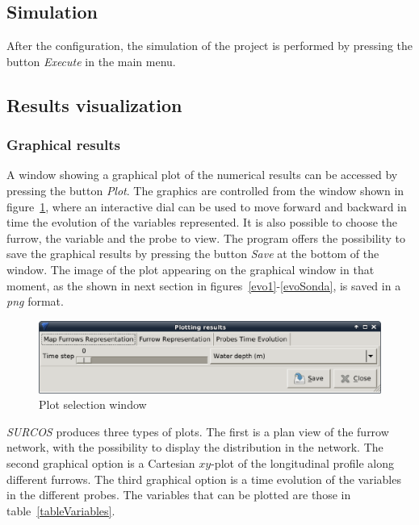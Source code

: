 \documentclass[review,authoryear]{elsarticle}
\begin{document}
\subsection{Simulation}

After the configuration, the simulation of the project is performed by pressing
the button \emph{Execute} in the main menu.

\subsection{Results visualization}

\subsubsection{Graphical results}

A window showing a graphical plot of the numerical results can be accessed by
pressing the button \emph{Plot}.
The graphics are controlled from the window shown in figure~\ref{barraRepres},
where an interactive dial can be used to move forward and backward in time the
evolution of the variables represented. It is also possible to choose the
furrow, the variable and the probe to view.  The program offers the possibility
to save the graphical results by pressing the button \emph{Save} at the bottom
of the window. The image of the plot appearing on the graphical window in that
moment, as the shown in next section in figures~\ref{evo1}-\ref{evoSonda}, is
saved in a \emph{png} format.

\begin{figure}[!ht]
\begin{center}
\includegraphics[width=706\UNIT]{menuRepresEN.eps}
\caption{Plot selection window}\label{barraRepres}
\end{center}
\end{figure}

\emph{SURCOS} produces three types of plots. The first is a plan view of
the furrow network, with the possibility to display the distribution in the
network. The second graphical option is a Cartesian $xy$-plot of the
longitudinal profile along different furrows. The third graphical option is a
time evolution of the variables in the different probes. The variables that can
be plotted are those in table~\ref{tableVariables}.
\end{document}
